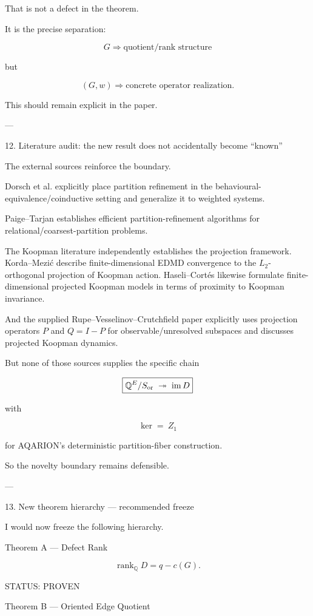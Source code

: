 That is not a defect in the theorem.

It is the precise separation:

\[
\boxed{
G\Rightarrow\text{quotient/rank structure}
}
\]

but

\[
\boxed{
(G,w)\Rightarrow\text{concrete operator realization}.
}
\]

This should remain explicit in the paper.


---

12. Literature audit: the new result does not accidentally become “known”

The external sources reinforce the boundary.

Dorsch et al. explicitly place partition refinement in the behavioural-equivalence/coinductive setting and generalize it to weighted systems. 

Paige–Tarjan establishes efficient partition-refinement algorithms for relational/coarsest-partition problems. 

The Koopman literature independently establishes the projection framework. Korda–Mezić describe finite-dimensional EDMD convergence to the \(L_2\)-orthogonal projection of Koopman action.  Haseli–Cortés likewise formulate finite-dimensional projected Koopman models in terms of proximity to Koopman invariance. 

And the supplied Rupe–Vesselinov–Crutchfield paper explicitly uses projection operators \(P\) and \(Q=I-P\) for observable/unresolved subspaces and discusses projected Koopman dynamics. 

But none of those sources supplies the specific chain

\[
\boxed{
\mathbb Q^E/S_{\rm or}
\;\twoheadrightarrow\;
\operatorname{im}D
}
\]

with

\[
\ker=\ Z_1
\]

for AQARION's deterministic partition-fiber construction.

So the novelty boundary remains defensible.


---

13. New theorem hierarchy — recommended freeze

I would now freeze the following hierarchy.

Theorem A — Defect Rank

\[
\boxed{
\operatorname{rank}_{\mathbb Q}D=q-c(G).
}
\]

STATUS: PROVEN

Theorem B — Oriented Edge Quotient

